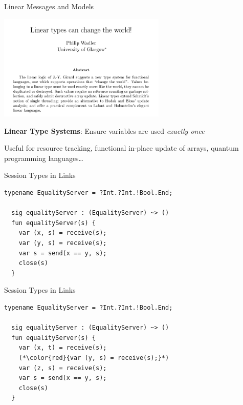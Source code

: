 \documentclass[11.5pt, aspectratio=169]{beamer}
\begin{document}
\begin{frame}{Linear Messages and Models}

  \begin{center}
    \includegraphics[width=0.6\textwidth]{images/linear-types.png}
  \end{center}

  \begin{fullpageitemize}
  \item \textbf{Linear Type Systems}: Ensure variables are used \emph{exactly once}
  \begin{itemize}
    \itemR Useful for resource tracking, functional in-place update of arrays, quantum programming languages\ldots
  \end{itemize}
  \end{fullpageitemize}

\end{frame}

\begin{frame}[fragile]{Session Types in Links}

\begin{lstlisting}[language=links]
  typename EqualityServer = ?Int.?Int.!Bool.End;

  sig equalityServer : (EqualityServer) ~> ()
  fun equalityServer(s) {
    var (x, s) = receive(s);
    var (y, s) = receive(s);
    var s = send(x == y, s);
    close(s)
  }
\end{lstlisting}
\end{frame}

\begin{frame}[fragile]{Session Types in Links}
\begin{lstlisting}[language=links]
  typename EqualityServer = ?Int.?Int.!Bool.End;

  sig equalityServer : (EqualityServer) ~> ()
  fun equalityServer(s) {
    var (x, t) = receive(s);
    (*\color{red}{var (y, s) = receive(s);}*)
    var (z, s) = receive(s);
    var s = send(x == y, s);
    close(s)
  }
\end{lstlisting}
\end{frame}
\end{document}
